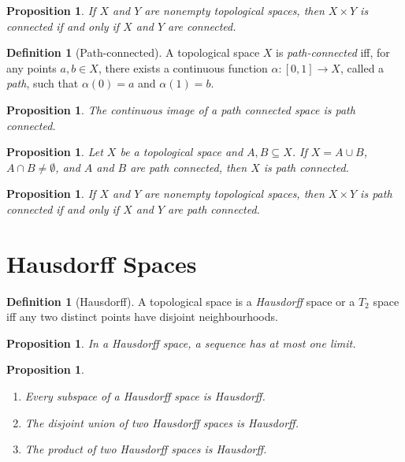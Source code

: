\documentclass{book}
\newtheorem{prop}[ax]{Proposition}
\theoremstyle{definition}
\newtheorem{df}[ax]{Definition}
\begin{document}
\begin{prop}
If $X$ and $Y$ are nonempty topological spaces, then
$X \times Y$ is connected if and only if $X$ and $Y$ are connected.
\end{prop}

\begin{df}[Path-connected]
A topological space $X$ is \emph{path-connected} iff, for any points $a,b \in X$, there exists a continuous function $\alpha : [0,1] \rightarrow X$, called a \emph{path}, such that $\alpha(0) = a$ and $\alpha(1) = b$.
\end{df}

\begin{prop}
The continuous image of a path connected space is path connected.
\end{prop}

\begin{prop}
Let $X$ be a topological space and $A,B \subseteq X$. If $X = A \cup B$, $A \cap B \neq \emptyset$, and $A$ and $B$ are path connected, then $X$ is path connected.
\end{prop}

\begin{prop}
If $X$ and $Y$ are nonempty topological spaces, then
$X \times Y$ is path connected if and only if $X$ and $Y$ are path connected.
\end{prop}

\section{Hausdorff Spaces}

\begin{df}[Hausdorff]
A topological space is a \emph{Hausdorff} space or a \emph{$T_2$} space iff any two distinct points have disjoint neighbourhoods.
\end{df}

\begin{prop}
In a Hausdorff space, a sequence has at most one limit.
\end{prop}

\begin{prop}
\begin{enumerate}
\item Every subspace of a Hausdorff space is Hausdorff.
\item The disjoint union of two Hausdorff spaces is Hausdorff.
\item The product of two Hausdorff spaces is Hausdorff.
\end{enumerate}
\end{prop}
\end{document}
